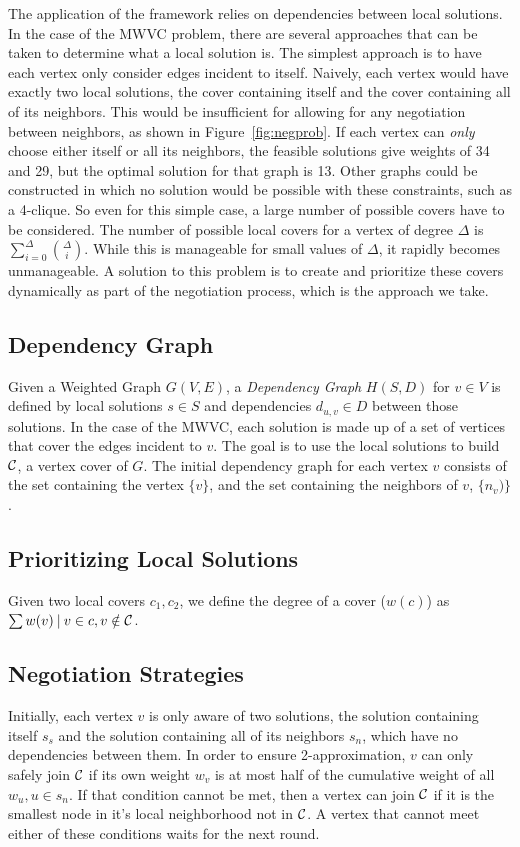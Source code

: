 The application of the framework relies on dependencies between local solutions. In the case of the MWVC problem, there are several approaches that can be taken to determine what a local solution is. The simplest approach is to have each vertex only consider edges incident to itself. Naively, each vertex would have exactly two local solutions, the cover containing itself and the cover containing all of its neighbors. This would be insufficient for allowing for any negotiation between neighbors, as shown in Figure~\ref{fig:negprob}. If each vertex can {\em only} choose either itself or all its neighbors, the feasible solutions give weights of 34 and 29, but the optimal solution for that graph is 13. Other graphs could be constructed in which no solution would be possible with these constraints, such as a 4-clique. So even for this simple case, a large number of possible covers have to be considered. The number of possible local covers for a vertex of degree $\Delta$ is $\sum_{i=0}^\Delta \binom{\Delta}{i}$. While this is manageable for small values of $\Delta$, it rapidly becomes unmanageable. A solution to this problem is to create and prioritize these covers dynamically as part of the negotiation process, which is the approach we take.

\subsection{Dependency Graph}
Given a Weighted Graph $G(V,E)$, a {\em Dependency Graph} $H(S,D)$ for $v \in V$ is defined by local solutions $s \in S$ and dependencies $d_{u,v} \in D$ between those solutions. In the case of the MWVC, each solution is made up of a set of vertices that cover the edges incident to $v$. The goal is to use the local solutions to build ${\mathcal C}$, a vertex cover of $G$. The initial dependency graph for each vertex $v$ consists of the set containing the vertex $\{v\}$, and the set containing the neighbors of $v$, $\{n_v)\}$. 

\subsection{Prioritizing Local Solutions}

Given two local covers $c_1, c_2$, we define the degree of a cover ($w(c)$) as $\sum w(v)\:|\: v \in c, v \notin {\mathcal C}$.  

\subsection{Negotiation Strategies}
Initially, each vertex $v$ is only aware of two solutions, the solution containing itself $s_s$ and the solution containing all of its neighbors $s_n$, which have no dependencies between them. In order to ensure 2-approximation, $v$ can only safely join ${\mathcal C}$ if its own weight $w_v$ is at most half of the cumulative weight of all $w_u, u \in s_n $. If that condition cannot be met, then a vertex can join ${\mathcal C}$ if it is the smallest node in it's local neighborhood not in ${\mathcal C}$. A vertex that cannot meet either of these conditions waits for the next round. 

